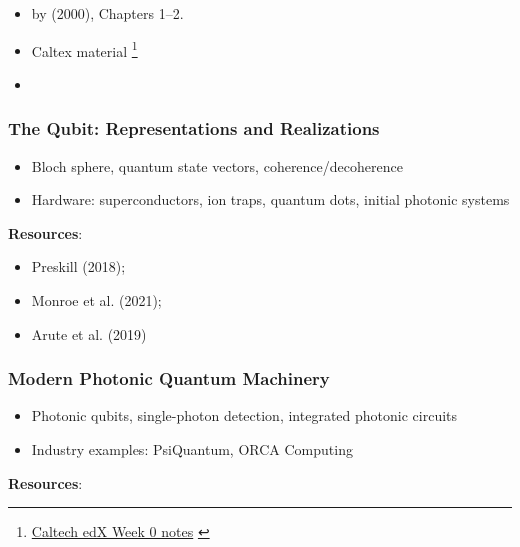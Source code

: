 \begin{itemize}
	\item {} by \citeauthor{Nielsen:2000} (2000), Chapters 1–2.
	\item Caltex material \footnote{\href{http://users.cms.caltech.edu/~vidick/teaching/120_qcrypto/LN_Week0.pdf}{Caltech edX Week 0 notes} \label{caltech:edX:week0}} %
	\item {}
\end{itemize}


\subsubsection{The Qubit: Representations and Realizations}

\begin{itemize}
	\item Bloch sphere, quantum state vectors, coherence/decoherence
	
	\item Hardware: superconductors, ion traps, quantum dots, initial photonic systems
\end{itemize}

\textbf{Resources}:

\begin{itemize}
	\item Preskill (2018); 

	\item Monroe et al. (2021); 

	\item Arute et al. (2019)
\end{itemize}


\subsubsection{Modern Photonic Quantum Machinery}

\begin{itemize}
	\item Photonic qubits, single-photon detection, integrated photonic circuits
	
	\item Industry examples: PsiQuantum, ORCA Computing
\end{itemize}

\textbf{Resources}:

